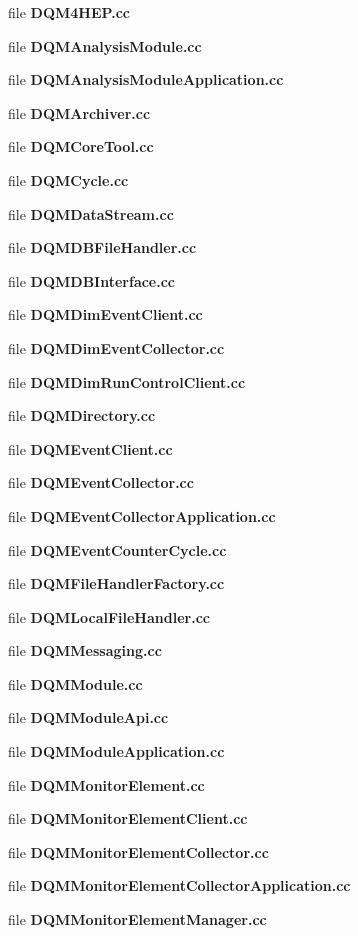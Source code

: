 \begin{DoxyCompactItemize}
\item 
file {\bf D\+Q\+M4\+H\+E\+P.\+cc}
\item 
file {\bf D\+Q\+M\+Analysis\+Module.\+cc}
\item 
file {\bf D\+Q\+M\+Analysis\+Module\+Application.\+cc}
\item 
file {\bf D\+Q\+M\+Archiver.\+cc}
\item 
file {\bf D\+Q\+M\+Core\+Tool.\+cc}
\item 
file {\bf D\+Q\+M\+Cycle.\+cc}
\item 
file {\bf D\+Q\+M\+Data\+Stream.\+cc}
\item 
file {\bf D\+Q\+M\+D\+B\+File\+Handler.\+cc}
\item 
file {\bf D\+Q\+M\+D\+B\+Interface.\+cc}
\item 
file {\bf D\+Q\+M\+Dim\+Event\+Client.\+cc}
\item 
file {\bf D\+Q\+M\+Dim\+Event\+Collector.\+cc}
\item 
file {\bf D\+Q\+M\+Dim\+Run\+Control\+Client.\+cc}
\item 
file {\bf D\+Q\+M\+Directory.\+cc}
\item 
file {\bf D\+Q\+M\+Event\+Client.\+cc}
\item 
file {\bf D\+Q\+M\+Event\+Collector.\+cc}
\item 
file {\bf D\+Q\+M\+Event\+Collector\+Application.\+cc}
\item 
file {\bf D\+Q\+M\+Event\+Counter\+Cycle.\+cc}
\item 
file {\bf D\+Q\+M\+File\+Handler\+Factory.\+cc}
\item 
file {\bf D\+Q\+M\+Local\+File\+Handler.\+cc}
\item 
file {\bf D\+Q\+M\+Messaging.\+cc}
\item 
file {\bf D\+Q\+M\+Module.\+cc}
\item 
file {\bf D\+Q\+M\+Module\+Api.\+cc}
\item 
file {\bf D\+Q\+M\+Module\+Application.\+cc}
\item 
file {\bf D\+Q\+M\+Monitor\+Element.\+cc}
\item 
file {\bf D\+Q\+M\+Monitor\+Element\+Client.\+cc}
\item 
file {\bf D\+Q\+M\+Monitor\+Element\+Collector.\+cc}
\item 
file {\bf D\+Q\+M\+Monitor\+Element\+Collector\+Application.\+cc}
\item 
file {\bf D\+Q\+M\+Monitor\+Element\+Manager.\+cc}

\end{DoxyCompactItemize}
